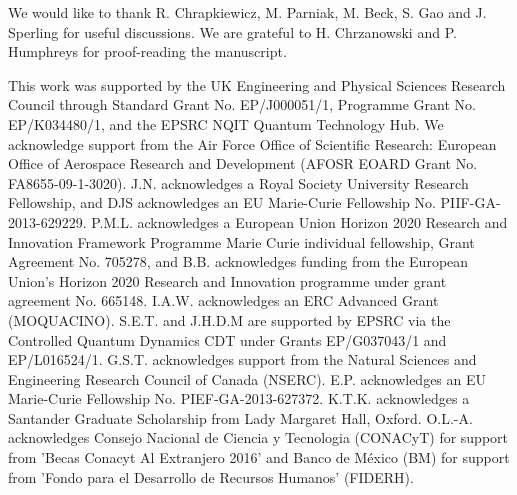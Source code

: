 \documentclass[%
 reprint,
 amsmath,amssymb,
 aps,
 pra,
]{revtex4-1}
\begin{document}
\begin{acknowledgments}
We would like to thank R. Chrapkiewicz, M. Parniak, M. Beck, S. Gao and J. Sperling for useful discussions. We are grateful to H. Chrzanowski and P. Humphreys for proof-reading the manuscript.

This work was supported by the UK Engineering and Physical Sciences Research Council through Standard Grant No. EP/J000051/1, Programme Grant No. EP/K034480/1, and the EPSRC NQIT Quantum Technology Hub. We acknowledge support from the Air Force Office of Scientific Research: European Office of Aerospace Research and Development (AFOSR EOARD Grant No. FA8655-09-1-3020). J.N. acknowledges a Royal Society University Research Fellowship, and DJS acknowledges an EU Marie-Curie Fellowship No. PIIF-GA-2013-629229. P.M.L. acknowledges a European Union Horizon 2020 Research and Innovation Framework Programme Marie Curie individual fellowship, Grant Agreement No. 705278, and B.B. acknowledges funding from the European Union’s Horizon 2020 Research and Innovation programme under grant agreement No. 665148. I.A.W. acknowledges an ERC Advanced Grant (MOQUACINO). S.E.T. and J.H.D.M are supported by EPSRC via the Controlled Quantum Dynamics CDT under Grants EP/G037043/1 and EP/L016524/1. G.S.T. acknowledges support from the Natural Sciences and Engineering Research Council of Canada (NSERC). E.P. acknowledges an EU Marie-Curie Fellowship No. PIEF-GA-2013-627372. K.T.K. acknowledges a Santander Graduate Scholarship from Lady Margaret Hall, Oxford. O.L.-A. acknowledges Consejo Nacional de Ciencia y Tecnologia (CONACyT) for support from 'Becas Conacyt Al Extranjero 2016' and Banco de M\'exico (BM) for support from 'Fondo para el Desarrollo de Recursos Humanos' (FIDERH).
\end{acknowledgments}
\end{document}
